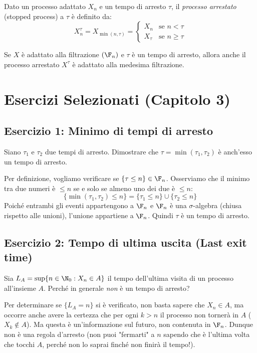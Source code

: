 \begin{definition}
Dato un processo adattato $X_n$ e un tempo di arresto $\tau$, il \emph{processo arrestato} (stopped process) a $\tau$ è definito da:
\[ X_n^\tau = X_{\min(n, \tau)} = \begin{cases}
X_n & \text{se } n < \tau \\
X_\tau & \text{se } n \ge \tau
\end{cases} \]
\end{definition}

\begin{theorem}
Se $X$ è adattato alla filtrazione $(\F_n)$ e $\tau$ è un tempo di arresto, allora anche il processo arrestato $X^\tau$ è adattato alla medesima filtrazione.
\end{theorem}

\section{Esercizi Selezionati (Capitolo 3)}

\subsection*{Esercizio 1: Minimo di tempi di arresto}
Siano $\tau_1$ e $\tau_2$ due tempi di arresto. Dimostrare che $\tau = \min(\tau_1, \tau_2)$ è anch'esso un tempo di arresto.
\begin{spiegazione}
Per definizione, vogliamo verificare se $\{\tau \le n\} \in \F_n$. Osserviamo che il minimo tra due numeri è $\le n$ se e solo se almeno uno dei due è $\le n$:
\[ \{\min(\tau_1, \tau_2) \le n\} = \{\tau_1 \le n\} \cup \{\tau_2 \le n\} \]
Poiché entrambi gli eventi appartengono a $\F_n$ e $\F_n$ è una $\sigma$-algebra (chiusa rispetto alle unioni), l'unione appartiene a $\F_n$. Quindi $\tau$ è un tempo di arresto.
\end{spiegazione}

\subsection*{Esercizio 2: Tempo di ultima uscita (Last exit time)}
Sia $L_A = \sup\{n \in \N_0 : X_n \in A\}$ il tempo dell'ultima visita di un processo all'insieme $A$. Perché in generale \emph{non} è un tempo di arresto?
\begin{spiegazione}
Per determinare se $\{L_A = n\}$ si è verificato, non basta sapere che $X_n \in A$, ma occorre anche avere la certezza che per ogni $k > n$ il processo non tornerà in $A$ ($X_k \notin A$). Ma questa è un'informazione sul futuro, non contenuta in $\F_n$. Dunque non è una regola d'arresto (non puoi "fermarti" a $n$ sapendo che è l'ultima volta che tocchi $A$, perché non lo saprai finché non finirà il tempo!).
\end{spiegazione}

